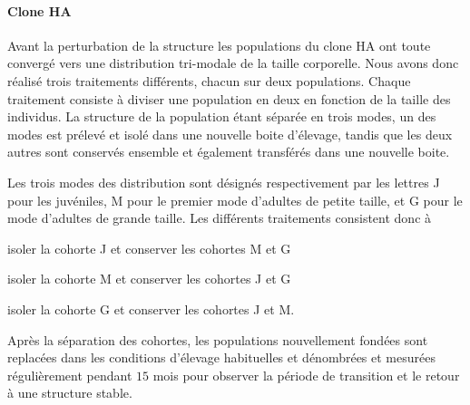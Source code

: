 \paragraph{Clone HA} Avant la perturbation de la structure les populations du
clone HA ont toute convergé vers une distribution tri-modale de la taille
corporelle. Nous avons donc réalisé trois traitements différents, chacun sur
deux populations. Chaque traitement consiste à diviser une population en deux en
fonction de la taille des individus. La structure de la population étant séparée
en trois modes, un des modes est prélevé et isolé dans une nouvelle boite
d'élevage, tandis que les deux autres sont conservés ensemble et également
transférés dans une nouvelle boite.

Les trois modes des distribution sont désignés respectivement par les lettres J
pour les juvéniles, M pour le premier mode d'adultes de petite taille, et G pour
le mode d'adultes de grande taille. Les différents traitements consistent donc à
\begin{enumerate*}[label=(\roman*), before=\unskip{ : }, itemjoin={{ ; }},
itemjoin*={{ ; et }}]
\item isoler la cohorte J et conserver les cohortes M et G
\item isoler la cohorte M et conserver les cohortes J et G
\item isoler la cohorte G et conserver les cohortes J et M.
\end{enumerate*} 
Après la séparation des cohortes, les populations nouvellement fondées sont
replacées dans les conditions d'élevage habituelles et dénombrées et mesurées
régulièrement pendant $15$ mois pour observer la période de transition et le
retour à une structure stable. 

